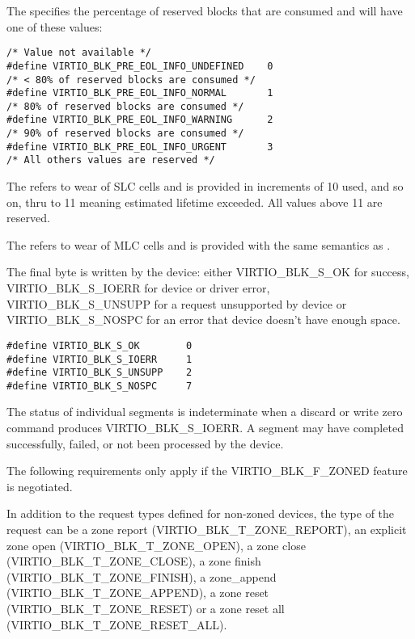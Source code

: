 The  specifies the percentage of reserved blocks
that are consumed and will have one of these values:

\begin{lstlisting}
/* Value not available */
#define VIRTIO_BLK_PRE_EOL_INFO_UNDEFINED    0
/* < 80% of reserved blocks are consumed */
#define VIRTIO_BLK_PRE_EOL_INFO_NORMAL       1
/* 80% of reserved blocks are consumed */
#define VIRTIO_BLK_PRE_EOL_INFO_WARNING      2
/* 90% of reserved blocks are consumed */
#define VIRTIO_BLK_PRE_EOL_INFO_URGENT       3
/* All others values are reserved */
\end{lstlisting}

The  refers to wear of SLC cells and is provided
in increments of 10%
used, and so on, thru to 11 meaning estimated lifetime exceeded.
All values above 11 are reserved.

The  refers to wear of MLC cells and is provided
with the same semantics as .

The final  byte is written by the device: either
VIRTIO_BLK_S_OK for success, VIRTIO_BLK_S_IOERR for device or driver
error, VIRTIO_BLK_S_UNSUPP for a request unsupported by device or
VIRTIO_BLK_S_NOSPC for an error that device doesn't have enough space.

\begin{lstlisting}
#define VIRTIO_BLK_S_OK        0
#define VIRTIO_BLK_S_IOERR     1
#define VIRTIO_BLK_S_UNSUPP    2
#define VIRTIO_BLK_S_NOSPC     7
\end{lstlisting}

The status of individual segments is indeterminate when a discard or write zero
command produces VIRTIO_BLK_S_IOERR.  A segment may have completed
successfully, failed, or not been processed by the device.

The following requirements only apply if the VIRTIO_BLK_F_ZONED feature is
negotiated.

In addition to the request types defined for non-zoned devices, the type of the
request can be a zone report (VIRTIO_BLK_T_ZONE_REPORT), an explicit zone open
(VIRTIO_BLK_T_ZONE_OPEN), a zone close (VIRTIO_BLK_T_ZONE_CLOSE), a zone finish
(VIRTIO_BLK_T_ZONE_FINISH), a zone_append (VIRTIO_BLK_T_ZONE_APPEND), a zone
reset (VIRTIO_BLK_T_ZONE_RESET) or a zone reset all
(VIRTIO_BLK_T_ZONE_RESET_ALL).

